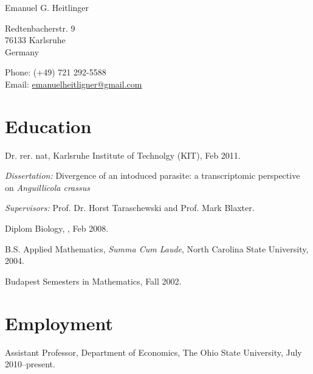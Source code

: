 \documentclass[10pt,letterpaper]{article}
\def\name{Emanuel G. Heitlinger}
\renewenvironment{itemize}{
  \begin{list}{}{
    \setlength{\leftmargin}{1.5em}
    \setlength{\itemsep}{0.25em}
    \setlength{\parskip}{0pt}
    \setlength{\parsep}{0.25em}
  }
}{
  \end{list}
}
\begin{document}
{\huge \name}


\bigskip

\begin{minipage}[t]{0.5\textwidth}
  Redtenbacherstr. 9 \\
  76133 Karlsruhe \\
  Germany
\end{minipage}
\begin{minipage}[t]{0.5\textwidth}
  Phone: (+49) 721 292-5588 \\
  Email: \href{mailto:emanuelheitlinger@gmail.com}{emanuelheitligner@gmail.com} \\
\end{minipage}

\section*{Education}

\begin{itemize}
\item Dr. rer. nat, Karlsruhe Institute of Technolgy (KIT), Feb 2011.
  \begin{itemize}
  \item \textit{Dissertation:} Divergence of an intoduced parasite:
    a transcriptomic perspective on \textit{Anguillicola crassus}
  \item \textit{Supervisors:}
    Prof. Dr. Horst Taraschewski and Prof. Mark Blaxter.
  \end{itemize}
\item Diplom Biology, , Feb 2008.
\item B.S. Applied Mathematics, \textit{Summa Cum Laude},
  North Carolina State University, 2004.
\item Budapest Semesters in Mathematics, Fall 2002.
\end{itemize}

\section*{Employment}

\begin{itemize}
\item Assistant Professor, Department of Economics, The Ohio State University,
  July 2010--present.
\end{itemize}
\end{document}
